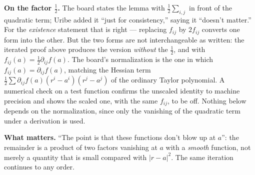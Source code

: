\documentclass[11pt]{report}
\begin{document}
\textbf{On the factor $\tfrac12$.} The board states the lemma with $\tfrac12 \sum_{i,j}$ in front of the quadratic term; Uribe added it ``just for consistency,'' saying it ``doesn't matter.'' For the \emph{existence} statement that is right --- replacing $f_{ij}$ by $2f_{ij}$ converts one form into the other. But the two forms are not interchangeable as written: the iterated proof above produces the version \emph{without} the $\tfrac12$, and with $f_{ij}(a) = \tfrac12 \partial_{ij} f(a)$. The board's normalization is the one in which $f_{ij}(a) = \partial_{ij} f(a)$, matching the Hessian term $\tfrac12 \sum \partial_{ij}f(a)(r^i - a^i)(r^j - a^j)$ of the ordinary Taylor polynomial. A numerical check on a test function confirms the unscaled identity to machine precision and shows the scaled one, with the same $f_{ij}$, to be off. Nothing below depends on the normalization, since only the vanishing of the quadratic term under a derivation is used.

\begin{rembox}\label{rem:abstract-tangent-6}
\textbf{What matters.} ``The point is that these functions don't blow up at $a$'': the remainder is a product of two factors vanishing at $a$ with a \emph{smooth} function, not merely a quantity that is small compared with $|r - a|^2$. The same iteration continues to any order.
\end{rembox}
\end{document}
